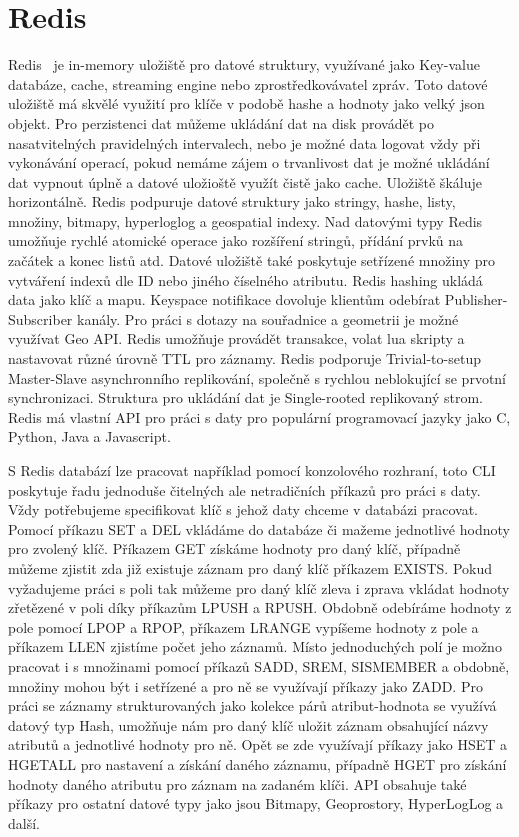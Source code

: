 \documentclass[czech,bachelor,dept460,male,csharp,cpdeclaration]{diploma}
\begin{document}
	\section{Redis}
	
	Redis~\cite{redis} je in-memory uložiště pro datové struktury, využívané jako Key-value databáze, cache, streaming engine nebo zprostředkovávatel zpráv. Toto datové uložiště má skvělé využití pro klíče v podobě hashe a hodnoty jako velký json objekt. Pro perzistenci dat můžeme ukládání dat na disk provádět po nasatvitelných pravidelných intervalech, nebo je možné data logovat vždy při vykonávání operací, pokud nemáme zájem o trvanlivost dat je možné ukládání dat vypnout úplně a datové uložioště využít čistě jako cache. Uložiště škáluje horizontálně. Redis podpuruje datové struktury jako stringy, hashe, listy, množiny, bitmapy, hyperloglog a geospatial indexy. Nad datovými typy Redis umožňuje rychlé atomické operace jako rozšíření stringů, přídání prvků na začátek a konec listů atd. Datové uložiště také poskytuje setřízené množiny pro vytváření indexů dle ID nebo jiného číselného atributu. Redis hashing ukládá data jako klíč a mapu. Keyspace notifikace dovoluje klientům odebírat Publisher-Subscriber kanály. Pro práci s dotazy na souřadnice a geometrii je možné využívat Geo API. Redis umožňuje provádět transakce, volat lua skripty a nastavovat různé úrovně TTL pro záznamy. Redis podporuje Trivial-to-setup Master-Slave asynchronního replikování, společně s rychlou neblokující se prvotní synchronizaci. Struktura pro ukládání dat je Single-rooted replikovaný strom. Redis má vlastní API pro práci s daty pro populární programovací jazyky jako C, Python, Java a Javascript.
	
	S Redis databází lze pracovat například pomocí konzolového rozhraní, toto CLI~\cite{rediscli} poskytuje řadu jednoduše čitelných ale netradičních příkazů pro práci s daty. Vždy potřebujeme specifikovat klíč s jehož daty chceme v databázi pracovat. Pomocí příkazu SET a DEL vkládáme  do databáze či mažeme jednotlivé hodnoty pro zvolený klíč. Příkazem GET získáme hodnoty pro daný klíč, případně můžeme zjistit zda již existuje záznam pro daný klíč příkazem EXISTS. Pokud vyžadujeme práci s poli tak můžeme pro daný klíč zleva i zprava vkládat hodnoty zřetězené v poli díky příkazům LPUSH a RPUSH. Obdobně odebíráme hodnoty z pole pomocí LPOP a RPOP, příkazem LRANGE vypíšeme hodnoty z pole a příkazem LLEN zjistíme počet jeho záznamů. Místo jednoduchých polí je možno pracovat i s množinami pomocí příkazů SADD, SREM, SISMEMBER a obdobně, množiny mohou být i setřízené a pro ně se využívají příkazy jako ZADD. Pro práci se záznamy strukturovaných jako kolekce párů atribut-hodnota se využívá datový typ Hash, umožňuje nám pro daný klíč uložit záznam obsahující názvy atributů a jednotlivé hodnoty pro ně. Opět se zde využívají příkazy jako HSET a HGETALL pro nastavení a získání daného záznamu, případně HGET pro získání hodnoty daného atributu pro záznam na zadaném klíči. API obsahuje také příkazy pro ostatní datové typy jako jsou Bitmapy, Geoprostory, HyperLogLog a další.
	
\end{document}
